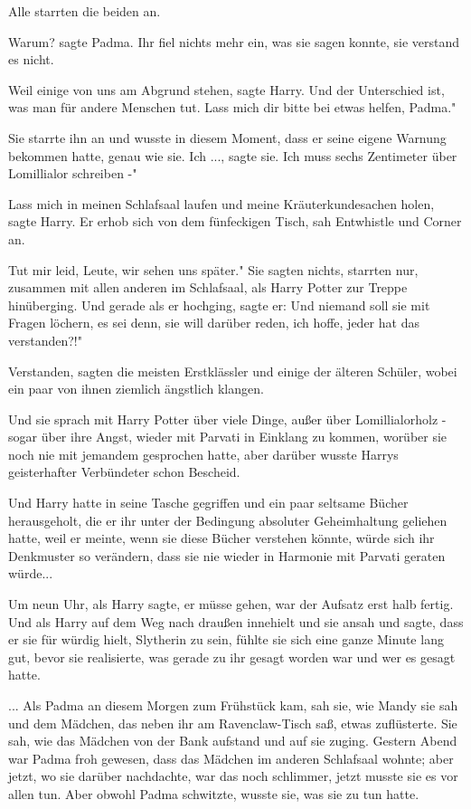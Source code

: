 Alle starrten die beiden an.

\glqq{}Warum?\grqq{} sagte Padma. Ihr fiel nichts mehr ein, was sie sagen konnte,
sie verstand es nicht.

\glqq{}Weil einige von uns am Abgrund stehen\grqq{}, sagte Harry. \glqq{}Und der
Unterschied ist, was man für andere Menschen tut. Lass mich dir bitte bei etwas
helfen, Padma."

Sie starrte ihn an und wusste in diesem Moment, dass er seine eigene Warnung
bekommen hatte, genau wie sie. \glqq{}Ich ...\grqq{}, sagte sie. \glqq{}Ich muss
sechs Zentimeter über Lomillialor schreiben -"

\glqq{}Lass mich in meinen Schlafsaal laufen und meine Kräuterkundesachen
holen\grqq{}, sagte Harry. Er erhob sich von dem fünfeckigen Tisch, sah
Entwhistle und Corner an.

\glqq{}Tut mir leid, Leute, wir sehen uns später." Sie sagten nichts, starrten
nur, zusammen mit allen anderen im Schlafsaal, als Harry Potter zur Treppe
hinüberging. Und gerade als er hochging, sagte er: \glqq{}Und niemand soll sie
mit Fragen löchern, es sei denn, sie will darüber reden, ich hoffe, jeder hat
das verstanden?!"

\glqq{}Verstanden\grqq{}, sagten die meisten Erstklässler und einige der älteren
Schüler, wobei ein paar von ihnen ziemlich ängstlich klangen.

Und sie sprach mit Harry Potter über viele Dinge, außer über Lomillialorholz -
sogar über ihre Angst, wieder mit Parvati in Einklang zu kommen, worüber sie
noch nie mit jemandem gesprochen hatte, aber darüber wusste Harrys geisterhafter
Verbündeter schon Bescheid.

Und Harry hatte in seine Tasche gegriffen und ein paar seltsame Bücher
herausgeholt, die er ihr unter der Bedingung absoluter Geheimhaltung geliehen
hatte, weil er meinte, wenn sie diese Bücher verstehen könnte, würde sich ihr
Denkmuster so verändern, dass sie nie wieder in Harmonie mit Parvati geraten
würde...

Um neun Uhr, als Harry sagte, er müsse gehen, war der Aufsatz erst halb fertig.
Und als Harry auf dem Weg nach draußen innehielt und sie ansah und sagte, dass
er sie für würdig hielt, Slytherin zu sein, fühlte sie sich eine ganze Minute
lang gut, bevor sie realisierte, was gerade zu ihr gesagt worden war und wer es
gesagt hatte.

... Als Padma an diesem Morgen zum Frühstück kam, sah sie, wie Mandy sie sah und
dem Mädchen, das neben ihr am Ravenclaw-Tisch saß, etwas zuflüsterte. Sie sah,
wie das Mädchen von der Bank aufstand und auf sie zuging. Gestern Abend war
Padma froh gewesen, dass das Mädchen im anderen Schlafsaal wohnte; aber jetzt,
wo sie darüber nachdachte, war das noch schlimmer, jetzt musste sie es vor allen
tun. Aber obwohl Padma schwitzte, wusste sie, was sie zu tun hatte.

